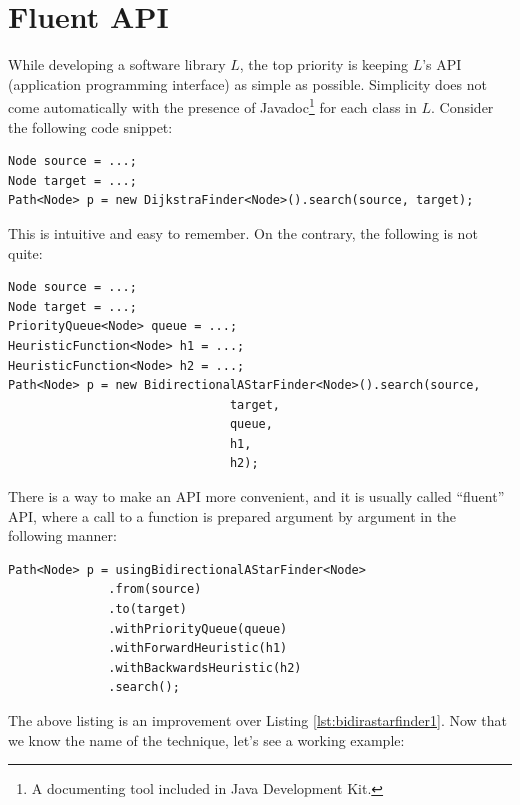 \documentclass[oneside]{book}
\begin{document}
\section{Fluent API}
While developing a software library $L$, the top priority is keeping $L$'s API (application programming interface) as simple as possible. Simplicity does not come automatically with the presence of Javadoc\footnote{A documenting tool included in Java Development Kit.} for each class in $L$. Consider the following code snippet:
\begin{lstlisting}
Node source = ...;
Node target = ...;
Path<Node> p = new DijkstraFinder<Node>().search(source, target);
\end{lstlisting}
\newpage
\noindent This is intuitive and easy to remember. On the contrary, the following is not quite:
\begin{lstlisting}[caption={Too much arguments for a method call},label=lst:bidirastarfinder1]
Node source = ...;
Node target = ...;
PriorityQueue<Node> queue = ...;
HeuristicFunction<Node> h1 = ...;
HeuristicFunction<Node> h2 = ...;
Path<Node> p = new BidirectionalAStarFinder<Node>().search(source, 
							   target, 
							   queue, 
							   h1, 
							   h2);
\end{lstlisting}
There is a way to make an API more convenient, and it is usually called ``fluent'' API, where a call to a function is prepared argument by argument in the following manner:
\begin{lstlisting}
Path<Node> p = usingBidirectionalAStarFinder<Node>
              .from(source)
              .to(target)
              .withPriorityQueue(queue)
              .withForwardHeuristic(h1)
              .withBackwardsHeuristic(h2)
              .search();
\end{lstlisting}
The above listing is an improvement over Listing \ref{lst:bidirastarfinder1}.
Now that we know the name of the technique, let's see a working example:
\lstset{
  numbers=left
}
\end{document}
